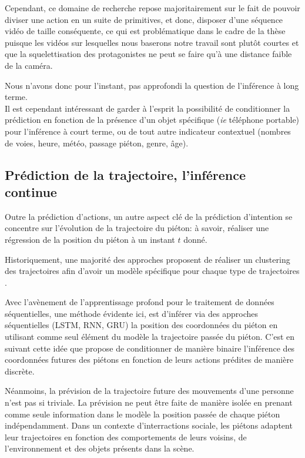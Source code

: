  Cependant, ce domaine de recherche repose majoritairement sur le fait de pouvoir diviser une action en un suite de primitives, et donc, disposer d'une séquence vidéo de taille conséquente, ce qui est problématique dans le cadre de la thèse puisque les vidéos sur lesquelles nous baserons notre travail sont plutôt courtes et que la squelettisation des protagonistes ne peut se faire qu'à une distance faible de la caméra.
 
 Nous n'avons donc pour l'instant, pas approfondi la question de l'inférence à long terme.\\
 Il est cependant intéressant de garder à l'esprit la possibilité de conditionner la prédiction en fonction de la présence d'un objet spécifique (\textit{ie} téléphone portable) pour l'inférence à court terme, ou de tout autre indicateur contextuel (nombres de voies, heure, météo, passage piéton, genre, âge).

\subsection{Prédiction de la trajectoire, l'inférence continue}

Outre la prédiction d'actions, un autre aspect clé de la prédiction d'intention se concentre sur l'évolution de la trajectoire du piéton: à savoir, réaliser une régression de la position du piéton à un instant $t$ donné.

Historiquement, une majorité des approches proposent de réaliser un clustering des trajectoires afin d'avoir un modèle spécifique pour chaque type de trajectoires \cite{zhou2011random, morris2011trajectory, kim2011gaussian}.

Avec l'avènement de l'apprentissage profond pour le traitement de données séquentielles, une méthode évidente ici, est d'inférer via des approches séquentielles (LSTM, RNN, GRU) la position des coordonnées du piéton en utilisant comme seul élément du modèle la trajectoire passée du piéton. C'est en suivant cette idée que \cite{DBLP:phd/hal/Pop19} propose de conditionner de manière binaire l'inférence des coordonnées futures des piétons en fonction de leurs actions prédites de manière discrète.

Néanmoins, la prévision de la trajectoire future des mouvements d'une personne n'est pas si triviale. La prévision ne peut être faite de manière isolée en prenant comme seule information dans le modèle la position passée de chaque piéton indépendamment. Dans un contexte d'interractions sociale, les piétons adaptent leur trajectoires en fonction des comportements de leurs voisins, de l'environnement et des objets présents dans la scène.



